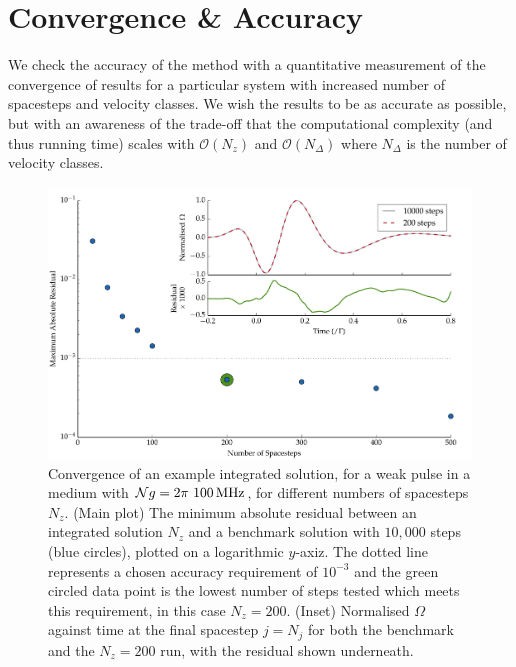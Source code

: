   \section{Convergence \& Accuracy}\label{sec:mb_accuracy}

    We check the accuracy of the method with a quantitative measurement of the
    convergence of results for a particular system with increased number of
    spacesteps and velocity classes. We wish the results to be as accurate as
    possible, but with an awareness of the trade-off that the computational
    complexity (and thus running time) scales with $\mathcal{O}(N_z)$ and
    $\mathcal{O}(N_\Delta)$ where $N_\Delta$ is the number of velocity classes.

    \begin{figure}
      \includegraphics[width=\linewidth]{figs/10_appendices/two_mb_solve_h_compare_fig1.pdf}
      \caption{
      Convergence of an example integrated solution, for a weak pulse in a
      medium with $\mathcal{N}g = \unit[2\pi~100]{MHz}$, for different numbers
      of spacesteps $N_z$. (Main plot) The minimum absolute residual between an
      integrated solution $N_z$ and a benchmark solution with $10,000$ steps
      (blue circles), plotted on a logarithmic $y$-axiz. The dotted line
      represents a chosen accuracy requirement of $10^{-3}$ and the green
      circled data point is the lowest number of steps tested which meets this
      requirement, in this case $N_z = 200$. (Inset) Normalised $\Omega$ against
      time at the final spacestep $j = N_j$ for both the benchmark and the $N_z
      = 200$ run, with the residual shown underneath.
      }
      \label{fig:steps_convergence}
    \end{figure}    

